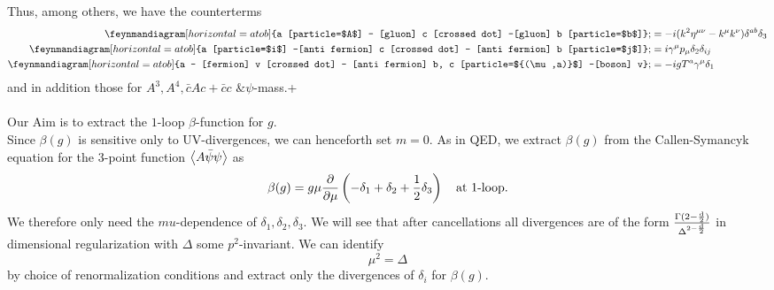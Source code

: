 Thus, among others, we have the counterterms
\begin{align}
	\feynmandiagram[horizontal=a to b]{a [particle=$A$] -- [gluon] c [crossed dot] --[gluon] b [particle=$b$]};
	&= -i (k^2 \eta^{\mu \nu} - k^\mu k^\nu) \delta^{ab} \delta_3 \\
	\feynmandiagram[horizontal=a to b]{a [particle=$i$] --[anti fermion] c [crossed dot] -- [anti fermion] b [particle=$j$]};
	&= i \gamma^\mu p_\mu \delta_2 \delta_{ij} \\
	\feynmandiagram[horizontal=a to b]{a -- [fermion] v [crossed dot] -- [anti fermion] b, c [particle=${(\mu,a)}$] --[boson] v};
	&= -ig T^a \gamma^\mu \delta_1
\end{align}
and in addition those for $A^3,A^4, \bar{c} A c+\bar{c} c$ $\& \psi$-mass.+
\\
\\
Our Aim is to extract the $1$-loop $\beta$-function for $g$.\\
Since $\beta(g)$ is sensitive only to UV-divergences, we can henceforth set $m=0$. As in QED, we extract $\beta(g)$ from the Callen-Symancyk equation for the $3$-point function $\expval{A\bar{\psi} \psi}$ as
\begin{equation}
\beta(g) = g \mu \frac{\partial}{\partial \mu} \left(-\delta_1 + \delta_2 + \frac{1}{2} \delta_3\right) \quad \text{at $1$-loop}.
\end{equation}
We therefore only need the $mu$-dependence of $\delta_1,\delta_2,\delta_3$. We will see that after cancellations all divergences are of the form 
$\frac{\Gamma(2-\frac{\mathrm{d}}{2})}{\Delta^{2-\frac{\mathrm{d}}{2}} }$ in dimensional regularization with $\Delta$ some $p^2$-invariant. We can identify
\begin{equation}
\mu^2 = \Delta
\end{equation}
by choice of renormalization conditions and extract only the divergences of $\delta_i$ for $\beta(g)$.



